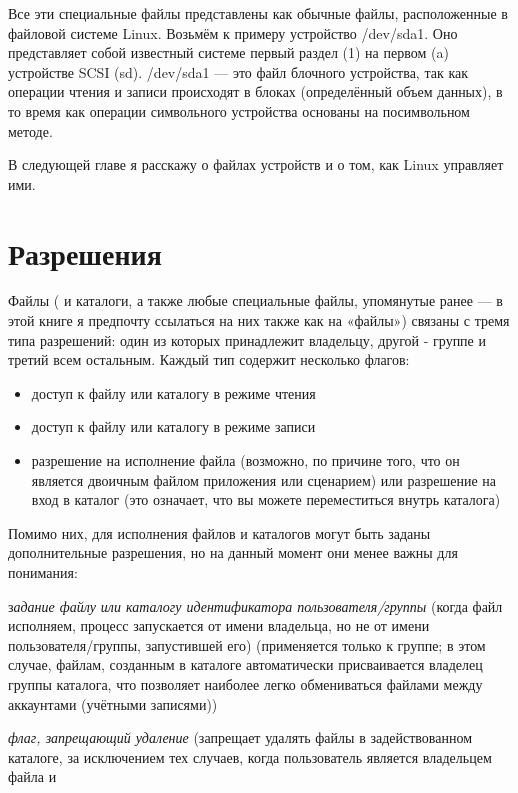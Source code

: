 \documentclass[12pt]{book}
\begin{document}
Все эти специальные файлы представлены как обычные файлы, расположенные  в файловой системе Linux. Возьмём к примеру устройство /dev/sda1. Оно представляет собой известный системе первый раздел (1) на первом (a) устройстве SCSI (sd). /dev/sda1 — это файл блочного устройства, так как операции чтения и записи происходят в блоках (определённый объем данных), в то время как операции символьного устройства основаны на посимвольном методе.

В следующей главе я расскажу о файлах устройств и о том, как Linux управляет ими.

\section{Разрешения}

Файлы ( и каталоги, а также любые специальные файлы, упомянутые ранее — в этой книге я предпочту ссылаться на них также как на «файлы») связаны с тремя типа разрешений: один из которых принадлежит владельцу, другой - группе и третий всем остальным. Каждый тип содержит несколько флагов:

\begin{itemize}
	\item доступ к файлу или каталогу в режиме чтения
	\item доступ к файлу или каталогу в режиме записи
	\item разрешение на исполнение файла (возможно, по причине того, что он является двоичным файлом приложения или сценарием) или разрешение на вход в каталог (это означает, что вы можете переместиться внутрь каталога)
\end{itemize}

Помимо них, для исполнения файлов и каталогов могут быть заданы дополнительные разрешения, но на данный момент они менее важны для понимания:

\begin{description}
	\item з\emph{адание файлу или каталогу идентификатора пользователя/группы} (когда файл исполняем, процесс запускается от имени владельца, но не от имени пользователя/группы, запустившей его) (применяется только к группе; в этом случае, файлам, созданным в каталоге автоматически присваивается владелец группы каталога, что позволяет наиболее легко обмениваться файлами между аккаунтами (учётными записями))
	\item\emph{ флаг, запрещающий удаление} (запрещает удалять файлы в задействованном каталоге, за исключением тех случаев, когда пользователь является владельцем файла и 
\end{description}
\end{document}
